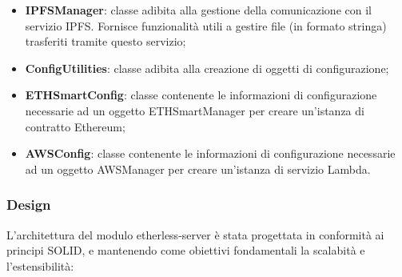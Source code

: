 \begin{itemize}
	\item \textbf{IPFSManager}: classe adibita alla gestione della comunicazione con il servizio IPFS. Fornisce funzionalità utili a gestire file (in formato stringa) trasferiti tramite questo servizio;
	\item \textbf{ConfigUtilities}: classe adibita alla creazione di oggetti di configurazione;
	\item \textbf{ETHSmartConfig}: classe contenente le informazioni di configurazione necessarie ad un oggetto ETHSmartManager per creare un'istanza di contratto Ethereum;
	\item \textbf{AWSConfig}: classe contenente le informazioni di configurazione necessarie ad un oggetto AWSManager per creare un'istanza di servizio Lambda.
\end{itemize}
\subsubsection{Design}
L'architettura del modulo etherless-server è stata progettata in conformità ai principi SOLID, e mantenendo come obiettivi fondamentali la scalabità e l'estensibilità:
